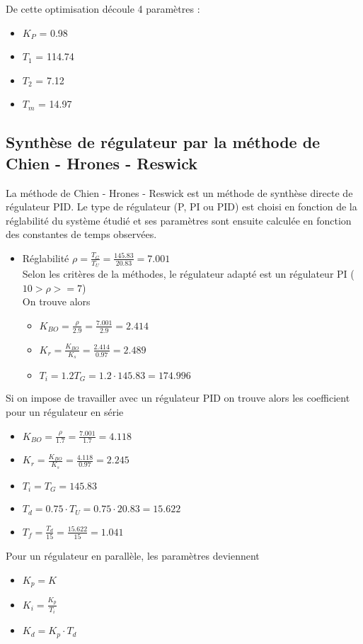 De cette optimisation découle 4 paramètres :
\begin{itemize}
\item $K_{P}$ = 0.98
\item $T_{1}$ = 114.74
\item $T_{2}$ = 7.12
\item $T_{m}$ = 14.97
\end{itemize}

\subsection{Synthèse de régulateur par la méthode de Chien - Hrones - Reswick}
La méthode de Chien - Hrones - Reswick est un méthode de synthèse directe de régulateur PID. Le type de régulateur (P, PI ou PID) est choisi en fonction de la réglabilité du système étudié et ses paramètres sont ensuite calculée en fonction des constantes de temps observées. 

\begin{itemize}
\item Réglabilité $\rho = \frac{T_{G}}{T_{U}} = \frac{145.83}{20.83} = 7.001$\\
Selon les critères de la méthodes, le régulateur adapté est un régulateur PI ($10 > \rho >= 7$)\\

On trouve alors 
\begin{itemize}
\item $K_{BO} = \frac{\rho}{2.9} = \frac{7.001}{2.9} = 2.414$
\item $K_{r} = \frac{K_{BO}}{K_{s}} = \frac{2.414}{0.97} = 2.489$
\item $T_{i} = 1.2T_{G} = 1.2 \cdot 145.83 = 174.996$
\end{itemize}
\end{itemize}

Si on impose de travailler avec un régulateur PID on trouve alors les coefficient pour un régulateur en série

\begin{itemize}
\item $K_{BO} = \frac{\rho}{1.7} = \frac{7.001}{1.7} = 4.118$
\item $K_{r} = \frac{K_{BO}}{K_{s}} = \frac{4.118}{0.97} = 2.245$
\item $T_{i} = T_{G} = 145.83$

\item $T_{d} = 0.75 \cdot T_{U} = 0.75 \cdot 20.83 = 15.622$
\item $T_{f} = \frac{T_{d}}{15} =  \frac{15.622}{15} = 1.041 $
\end{itemize}

Pour un régulateur en parallèle, les paramètres deviennent 
\begin{itemize}
\item $K_{p} = K$
\item $K_{i} = \frac{K_{p}}{T_{i}}$
\item $K_{d} = K_{p} \cdot T_{d}$
\end{itemize}